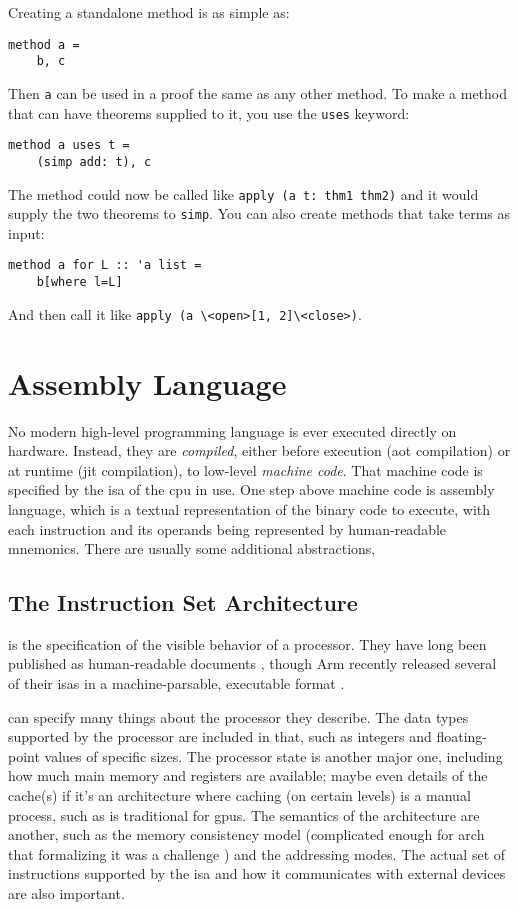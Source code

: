Creating a standalone method is as simple as:
\begin{lstlisting}[gobble=2]
  method a =
    b, c
\end{lstlisting}
Then \lstinline|a| can be used in a proof the same as any other method.
To make a method that can have theorems supplied to it,
you use the \lstinline|uses| keyword:
\begin{lstlisting}[gobble=2]
  method a uses t =
    (simp add: t), c
\end{lstlisting}
The method could now be called like \lstinline|apply (a t: thm1 thm2)|
and it would supply the two theorems to \lstinline|simp|.
You can also create methods that take terms as input:
\begin{lstlisting}[gobble=2]
  method a for L :: 'a list =
    b[where l=L]
\end{lstlisting}
And then call it like \lstinline|apply (a \<open>[1, 2]\<close>)|.

\section{Assembly Language}\label{se:assembly_language}
No modern high-level programming language is ever executed directly on hardware.
Instead, they are \emph{compiled},%
either before execution (\ac{aot} compilation) or at runtime (\ac{jit} compilation),
to low-level \emph{machine code}. That machine code is specified
by the \ac{isa} of the \ac{cpu} in use.
One step above machine code is assembly language, which is a textual representation
of the binary code to execute, with each instruction and its operands
being represented by human-readable mnemonics.
There are usually some additional abstractions,

\subsection{The  Instruction Set Architecture}
 is the specification of the visible behavior of a processor.
They have long been published as human-readable documents
\autocite{bowen1985cards,intel2019manual},
though Arm recently released several of their \acp{isa} in a machine-parsable,
executable format \autocite{reid2016arm}.

 can specify many things about the processor they describe.
The data types supported by the processor are included in that,
such as integers and floating-point values of specific sizes.
The processor state is another major one, including how much main memory and registers
are available; maybe even details of the cache(s) if it's an architecture
where caching (on certain levels) is a manual process, such as is traditional
for \acp{gpu}.
The semantics of the architecture are another, such as the memory consistency model
(complicated enough for \gls{arch} that formalizing it was a challenge
\autocite{sewell2010tso,owens2009tso,owens2009tsoextended})
and the addressing modes.
The actual set of instructions supported by the \ac{isa}
and how it communicates with external devices are also important.

